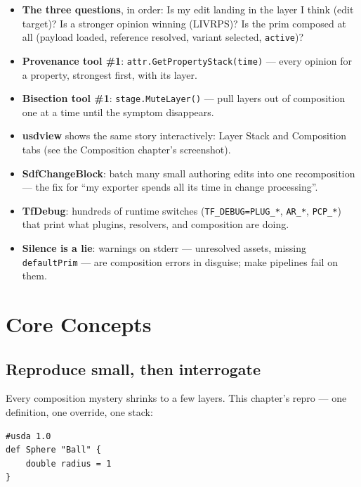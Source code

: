 \CheatSheetTitle
\begin{itemize}[leftmargin=*]
  \item \textbf{The three questions}, in order: Is my edit landing in the
        layer I think (edit target)? Is a stronger opinion winning (LIVRPS)?
        Is the prim composed at all (payload loaded, reference resolved,
        variant selected, \texttt{active})?
  \item \textbf{Provenance tool \#1}:
        \texttt{attr.GetPropertyStack(time)} --- every opinion for a
        property, strongest first, with its layer.
  \item \textbf{Bisection tool \#1}: \texttt{stage.MuteLayer()} --- pull
        layers out of composition one at a time until the symptom
        disappears.
  \item \textbf{usdview} shows the same story interactively: Layer Stack and
        Composition tabs (see the Composition chapter's screenshot).
  \item \textbf{SdfChangeBlock}: batch many small authoring edits into one
        recomposition --- the fix for ``my exporter spends all its time in
        change processing''.
  \item \textbf{TfDebug}: hundreds of runtime switches
        (\texttt{TF\_DEBUG=PLUG\_*}, \texttt{AR\_*}, \texttt{PCP\_*}) that
        print what plugins, resolvers, and composition are doing.
  \item \textbf{Silence is a lie}: warnings on stderr --- unresolved assets,
        missing \texttt{defaultPrim} --- are composition errors in disguise;
        make pipelines fail on them.
\end{itemize}

\section{Core Concepts}

\subsection{Reproduce small, then interrogate}\label{sec:dbg-repro}
Every composition mystery shrinks to a few layers. This chapter's repro ---
one definition, one override, one stack:

\begin{lstlisting}
#usda 1.0
def Sphere "Ball" {
    double radius = 1
}
\end{lstlisting}

